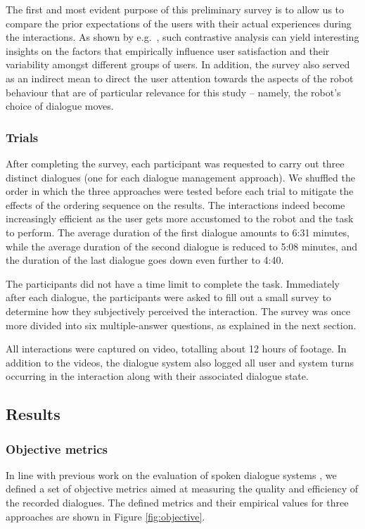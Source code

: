 The first and most evident purpose of this preliminary survey is to allow us to compare the prior expectations of the users with their actual experiences during the interactions.  As shown by e.g.\ \cite{JokinenH06}, such contrastive analysis can yield interesting insights on the factors that empirically influence user satisfaction and their variability amongst different groups of users.  In addition, the survey also served as an indirect mean to direct the user attention towards the aspects of the robot behaviour that are of particular relevance for this study -- namely, the robot's choice of dialogue moves. 


\subsubsection*{Trials}

After completing the survey, each participant was requested to carry out three distinct dialogues (one for each dialogue management approach).  We shuffled the order in which the three approaches were tested before each trial to mitigate the effects of the ordering sequence on the results. The interactions indeed become increasingly efficient as the user gets more accustomed to the robot and the task to perform.  The average duration of the first dialogue amounts to 6:31 minutes, while the average duration of the second dialogue is reduced to 5:08 minutes, and the duration of the last dialogue goes down even further to 4:40.

The participants did not have a time limit to complete the task. Immediately after each dialogue, the participants were asked to fill out a small survey to determine how they subjectively perceived the interaction.  The survey was once more divided into six multiple-answer questions, as explained in the next section.

All interactions were captured on video, totalling about 12 hours of footage. In addition to the videos, the dialogue system also logged all user and system turns occurring in the interaction along with their associated dialogue state.


\subsection{Results}
\label{sec:results-exp3}

\subsubsection*{Objective metrics}
In line with previous work on the evaluation of spoken dialogue systems \citep[see e.g.][ch.~6 for an overview]{2009Jokinen}, we defined a set of objective metrics aimed at measuring the quality and efficiency of the recorded dialogues.  The defined metrics and their empirical values for three approaches are shown in Figure \ref{fig:objective}.


